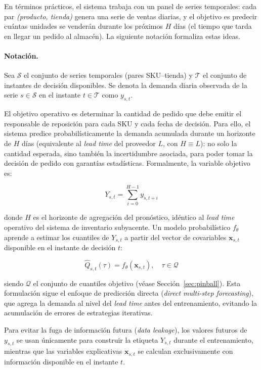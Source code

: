 En términos prácticos, el sistema trabaja con un panel de series temporales: cada par
\textit{(producto, tienda)} genera una serie de ventas diarias, y el objetivo es predecir
cuántas unidades se venderán durante los próximos $H$ días (el tiempo que tarda en llegar
un pedido al almacén). La siguiente notación formaliza estas ideas.

\paragraph{Notación.}
Sea $\mathcal{S}$ el conjunto de series temporales (pares SKU--tienda) y $\mathcal{T}$ el conjunto de instantes de decisión disponibles. Se denota la demanda diaria observada de la serie $s \in \mathcal{S}$ en el instante $t \in \mathcal{T}$ como $y_{s,t}$.

El objetivo operativo es determinar la cantidad de pedido que debe emitir el responsable de reposición para cada SKU y cada fecha de decisión. Para ello, el sistema predice probabilísticamente la demanda acumulada durante un horizonte de $H$ días (equivalente al \textit{lead time} del proveedor $L$, con $H \equiv L$): no solo la cantidad esperada, sino también la incertidumbre asociada, para poder tomar la decisión de pedido con garantías estadísticas. Formalmente, la variable objetivo es:

\begin{equation}
    Y_{s,t} = \sum_{i=0}^{H-1} y_{s, t+i}
\end{equation}

donde $H$ es el horizonte de agregación del pronóstico, idéntico al \textit{lead time} operativo del sistema de inventario subyacente. Un modelo probabilístico $f_{\theta}$ aprende a estimar los cuantiles de $Y_{s,t}$ a partir del vector de covariables $\mathbf{x}_{s,t}$ disponible en el instante de decisión $t$:

\begin{equation}
    \hat{Q}_{s,t}(\tau) = f_{\theta}(\mathbf{x}_{s,t}), \quad \tau \in \mathcal{Q}
\end{equation}

siendo $\mathcal{Q}$ el conjunto de cuantiles objetivo (véase Sección~\ref{sec:pinball}). Esta formulación sigue el enfoque de predicción directa (\textit{direct multi-step forecasting}), que agrega la demanda al nivel del \textit{lead time} antes del entrenamiento, evitando la acumulación de errores de estrategias iterativas.

Para evitar la fuga de información futura (\textit{data leakage}), los valores futuros de $y_{s,t}$ se usan únicamente para construir la etiqueta $Y_{s,t}$ durante el entrenamiento, mientras que las variables explicativas $\mathbf{x}_{s,t}$ se calculan exclusivamente con información disponible en el instante $t$.

